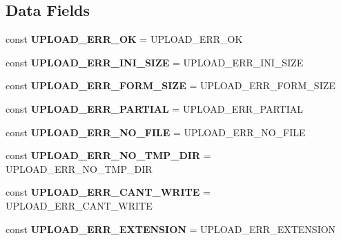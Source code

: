 \subsection*{Data Fields}
\begin{DoxyCompactItemize}
\item 
\mbox{\label{class_pes_1_1_http_1_1_uploaded_file_error_enum_a4d8b6cf5fb96d01b098d0fc5d6475588}} 
const {\bfseries U\+P\+L\+O\+A\+D\+\_\+\+E\+R\+R\+\_\+\+OK} = U\+P\+L\+O\+A\+D\+\_\+\+E\+R\+R\+\_\+\+OK
\item 
\mbox{\label{class_pes_1_1_http_1_1_uploaded_file_error_enum_a0b1e137a662a9f3e71e5599b2a872684}} 
const {\bfseries U\+P\+L\+O\+A\+D\+\_\+\+E\+R\+R\+\_\+\+I\+N\+I\+\_\+\+S\+I\+ZE} = U\+P\+L\+O\+A\+D\+\_\+\+E\+R\+R\+\_\+\+I\+N\+I\+\_\+\+S\+I\+ZE
\item 
\mbox{\label{class_pes_1_1_http_1_1_uploaded_file_error_enum_a7e21b4a08e014f16cfe748cc3f1ec9e9}} 
const {\bfseries U\+P\+L\+O\+A\+D\+\_\+\+E\+R\+R\+\_\+\+F\+O\+R\+M\+\_\+\+S\+I\+ZE} = U\+P\+L\+O\+A\+D\+\_\+\+E\+R\+R\+\_\+\+F\+O\+R\+M\+\_\+\+S\+I\+ZE
\item 
\mbox{\label{class_pes_1_1_http_1_1_uploaded_file_error_enum_acb13e00e696f86439a45fbc1a689b55c}} 
const {\bfseries U\+P\+L\+O\+A\+D\+\_\+\+E\+R\+R\+\_\+\+P\+A\+R\+T\+I\+AL} = U\+P\+L\+O\+A\+D\+\_\+\+E\+R\+R\+\_\+\+P\+A\+R\+T\+I\+AL
\item 
\mbox{\label{class_pes_1_1_http_1_1_uploaded_file_error_enum_a9f9c9a1cb683a1361b7878966b6bbab0}} 
const {\bfseries U\+P\+L\+O\+A\+D\+\_\+\+E\+R\+R\+\_\+\+N\+O\+\_\+\+F\+I\+LE} = U\+P\+L\+O\+A\+D\+\_\+\+E\+R\+R\+\_\+\+N\+O\+\_\+\+F\+I\+LE
\item 
\mbox{\label{class_pes_1_1_http_1_1_uploaded_file_error_enum_a21c026d2e017d23e7a6e7b80eed4aeb2}} 
const {\bfseries U\+P\+L\+O\+A\+D\+\_\+\+E\+R\+R\+\_\+\+N\+O\+\_\+\+T\+M\+P\+\_\+\+D\+IR} = U\+P\+L\+O\+A\+D\+\_\+\+E\+R\+R\+\_\+\+N\+O\+\_\+\+T\+M\+P\+\_\+\+D\+IR
\item 
\mbox{\label{class_pes_1_1_http_1_1_uploaded_file_error_enum_a87b249c935449291717568007706060e}} 
const {\bfseries U\+P\+L\+O\+A\+D\+\_\+\+E\+R\+R\+\_\+\+C\+A\+N\+T\+\_\+\+W\+R\+I\+TE} = U\+P\+L\+O\+A\+D\+\_\+\+E\+R\+R\+\_\+\+C\+A\+N\+T\+\_\+\+W\+R\+I\+TE
\item 
\mbox{\label{class_pes_1_1_http_1_1_uploaded_file_error_enum_a015b1c7cf37f4fc26e5ca0a1878b9f09}} 
const {\bfseries U\+P\+L\+O\+A\+D\+\_\+\+E\+R\+R\+\_\+\+E\+X\+T\+E\+N\+S\+I\+ON} = U\+P\+L\+O\+A\+D\+\_\+\+E\+R\+R\+\_\+\+E\+X\+T\+E\+N\+S\+I\+ON
\end{DoxyCompactItemize}
